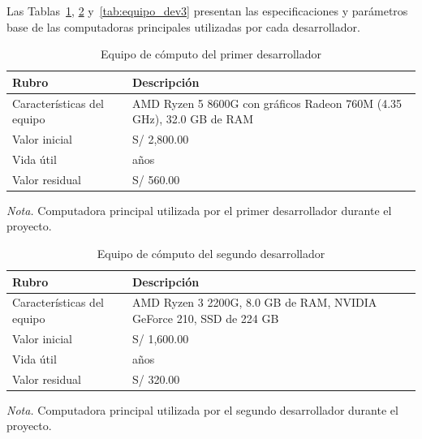 Las Tablas~\ref{tab:equipo_dev1}, \ref{tab:equipo_dev2} y~\ref{tab:equipo_dev3} presentan las especificaciones y parámetros base de las computadoras principales utilizadas por cada desarrollador.

\begin{table}[htbp]
\centering
\caption{Equipo de cómputo del primer desarrollador}
\label{tab:equipo_dev1}
\begin{tabularx}{\textwidth}{@{}>{\raggedright\arraybackslash}p{4.2cm} >{\raggedright\arraybackslash}X@{}}
\toprule
\textbf{Rubro} & \textbf{Descripción} \\
\midrule
Características del equipo & AMD Ryzen 5 8600G con gráficos Radeon 760M (4.35 GHz), 32.0 GB de RAM \\
Valor inicial & S/ 2,800.00 \\
Vida útil & 5 años \\
Valor residual & S/ 560.00 \\
\bottomrule
\end{tabularx}
\par\vspace{0.3em}
\raggedright\footnotesize{\textit{Nota.} Computadora principal utilizada por el primer desarrollador durante el proyecto.}
\end{table}

\begin{table}[htbp]
\centering
\caption{Equipo de cómputo del segundo desarrollador}
\label{tab:equipo_dev2}
\begin{tabularx}{\textwidth}{@{}>{\raggedright\arraybackslash}p{4.2cm} >{\raggedright\arraybackslash}X@{}}
\toprule
\textbf{Rubro} & \textbf{Descripción} \\
\midrule
Características del equipo & AMD Ryzen 3 2200G, 8.0 GB de RAM, NVIDIA GeForce 210, SSD de 224 GB \\
Valor inicial & S/ 1,600.00 \\
Vida útil & 5 años \\
Valor residual & S/ 320.00 \\
\bottomrule
\end{tabularx}
\par\vspace{0.3em}
\raggedright\footnotesize{\textit{Nota.} Computadora principal utilizada por el segundo desarrollador durante el proyecto.}
\end{table}

